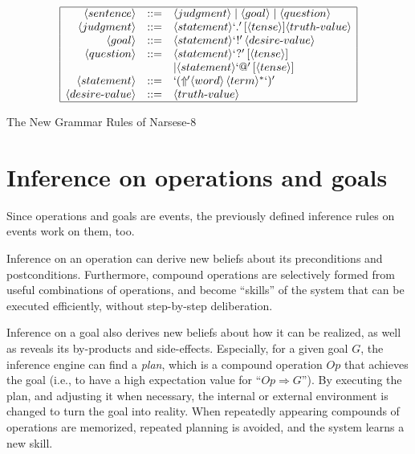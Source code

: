\begin{table}[htb]
\[\begin{array}{|rrl|}
\hline
\langle sentence \rangle & ::= & \langle judgment \rangle \; | \; \langle goal \rangle \; | \;  \langle  question \rangle \\
\langle judgment \rangle & ::= & \langle statement \rangle `.' \, [\langle tense \rangle] \langle truth \mbox{-} value \rangle \\
\langle goal \rangle  & ::= & \langle  statement \rangle  `!' \, \langle  desire \mbox{-} value \rangle \\ \langle question \rangle & ::= & \langle statement \rangle `?' \, [\langle tense \rangle] \\ 
                             &&  | \langle statement \rangle `@' \, [\langle tense \rangle] \\
\langle statement \rangle & ::= & `(\Uparrow\!\!'\langle word \rangle \, \langle term \rangle ^* `)' \\
\langle desire\mbox{-}value \rangle  & ::= & \langle truth\mbox{-}value \rangle  \\
\hline
\end{array} \]
\caption{The New Grammar Rules of Narsese-8}
\label{Narsese-8}
\end{table}

\section{Inference on operations and goals}

Since operations and goals are events, the previously defined inference rules on events work on them, too. 

Inference on an operation can derive new beliefs about its preconditions and postconditions. Furthermore, compound operations are selectively formed from useful combinations of operations, and become ``skills'' of the system that can be executed efficiently, without step-by-step deliberation.

Inference on a goal also derives new beliefs about how it can be realized, as well as reveals its by-products and side-effects. Especially, for a given goal $G$, the inference engine can find a \emph{plan}, which is a compound operation $Op$ that achieves the goal (i.e., to have a high expectation value for ``\(Op \Rightarrow G\)'').  By executing the plan, and adjusting it when necessary, the internal or external environment is changed to turn the goal into reality. When repeatedly appearing compounds of operations are memorized, repeated planning is avoided, and the system learns a new skill.

